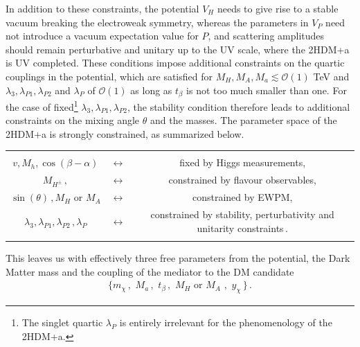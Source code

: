 In addition to these constraints, the potential $V_H$ needs to give rise to a stable vacuum breaking the electroweak symmetry, whereas the parameters in $V_P$ need not introduce a vacuum expectation value for $P$, and scattering amplitudes should remain perturbative \cite{Gunion:2002zf,Barroso:2013awa} and unitary \cite{Kanemura:1993hm,Akeroyd:2000wc,Ginzburg:2005dt,Grinstein:2015rtl} up to the UV scale, where the 2HDM+a is UV completed.  These conditions impose additional constraints on the quartic couplings in the potential, which are satisfied for $M_H, M_A, M_a \lesssim \mathcal{O}(1)$ TeV and $\lambda_3, \lambda_{P1}, \lambda_{P2}$ and $\lambda_P$ of $\mathcal{O}(1)$ as long as $t_\beta$ is not too much smaller than one. For the case of fixed\footnote{The singlet quartic $\lambda_P$ is entirely irrelevant for the phenomenology of the 2HDM+a.} $\lambda_3, \lambda_{P1}, \lambda_{P2}$, the stability condition therefore leads to additional constraints on the mixing angle $\theta$ and the masses. The parameter space of the 2HDM+a is strongly constrained, as summarized below.
%
\newline
\begin{tabular}{cc c}
&&\\
$v, M_h, \cos(\beta-\alpha) $&$\longleftrightarrow$& fixed by Higgs measurements,\\[.3cm]
$M_{H^\pm}\,, $  &$\longleftrightarrow $& constrained by flavour observables,\\[.3cm]
$\sin(\theta)\,, M_H \,\,\text{or} \,\,M_A$  &$\longleftrightarrow $& constrained by EWPM,\\[.3cm]
$\lambda_3, \lambda_{P1}, \lambda_{P2}\,,\lambda_P $ &$\longleftrightarrow $& constrained by stability, perturbativity and unitarity constraints\,.\\[.3cm]
&&
\end{tabular}
\newline
%
This leaves us with effectively three free parameters from the potential, the Dark Matter mass and the coupling of the mediator to the DM candidate
\begin{align}
\big\{ m_\chi\,,\,\,M_a\,,\,\, t_\beta\,, \,\, M_H\,\,\text{or}\,\,M_A\,\,, \,\, y_\chi\,\big\}\,.
\end{align}



